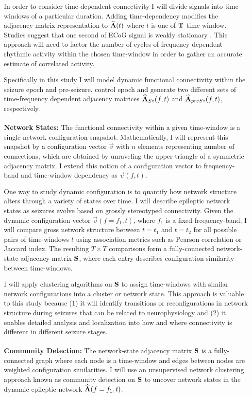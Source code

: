 In order to consider time-dependent connectivity I will divide signals into time-windows of a particular duration. Adding time-dependency modifies the adjacency matrix representation to $\widehat{\mathbf{\displaystyle A}}(t)$ where $t$ is one of $\mathbf{\displaystyle T}$ time-window. Studies suggest that one second of ECoG signal is weakly stationary \cite{kramer2010coalescence}. This approach will need to factor the number of cycles of frequency-dependent rhythmic activity within the chosen time-window in order to gather an accurate estimate of correlated activity.

Specifically in this study I will model dynamic functional connectivity within the seizure epoch and pre-seizure, control epoch and generate two different sets of time-frequency dependent adjacency matrices $\widehat{\mathbf{\displaystyle A}}_{Sz}(f,t)$ and $\widehat{\mathbf{\displaystyle A}}_{preSz}(f,t)$, respectively.
~\\
~\\
\textbf{Network States:}
The functional connectivity within a given time-window is a single network configuration snapshot. Mathematically, I will represent this snapshot by a configuration vector $\vec{v}$ with $n$ elements representing number of connections, which are obtained by unraveling the upper-triangle of a symmetric adjacency matrix. I extend this notion of a configuration vector to frequency-band and time-window dependency as $\vec{v}(f,t)$.

One way to study dynamic configuration is to quantify how network structure alters through a variety of states over time. I will describe epileptic network states as seizures evolve based on grossly stereotyped connectivity. Given the dynamic configuration vector $\vec{v}(f=f_1,t)$, where $f_{1}$ is a fixed frequency-band, I will compare gross network structure between $t=t_1$ and $t=t_2$ for all possible pairs of time-windows $t$ using association metrics such as Pearson correlation or Jaccard index. The resulting $T \times T$ comparisons form a fully-connected network-state adjacency matrix $\mathbf{\displaystyle S}$, where each entry describes configuration similarity between time-windows.

I will apply clustering algorithms on $\mathbf{\displaystyle S}$ to assign time-windows with similar network configurations into a cluster or network state. This approach is valuable to this study because (1) it will identify transitions or reconfigurations in network structure during seizures that can be related to neurophysiology and (2) it enables detailed analysis and localization into how and where connectivity is different in different seizure stages.
~\\
~\\
\textbf{Community Detection:}
The network-state adjacency matrix $\mathbf{\displaystyle S}$ is a fully-connected graph where each node is a time-window and edges between nodes are weighted configuration similarities. I will use an unsupervised network clustering approach known as community detection on $\mathbf{\displaystyle S}$ to uncover network states in the dynamic epileptic network $\widehat{\mathbf{\displaystyle A}}(f=f_1,t)$.

